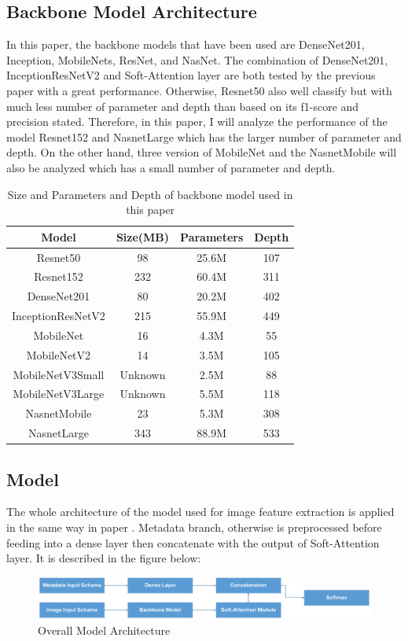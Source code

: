 \subsection{Backbone Model Architecture}
In this paper, the backbone models that have been used are DenseNet201\cite{06993}, Inception\cite{00567}, MobileNets\cite{04861}\cite{04381}\cite{02244}, ResNet\cite{03385}\cite{05027}, and NasNet\cite{07012}. The combination of DenseNet201, InceptionResNetV2 and Soft-Attention layer are both tested by the previous paper\cite{03358} with a great performance. Otherwise, Resnet50 also well classify but with much less number of parameter and depth than based on its f1-score and precision stated. Therefore, in this paper, I will analyze the performance of the model Resnet152 and NasnetLarge which has the larger number of parameter and depth. On the other hand, three version of MobileNet and the NasnetMobile will also be analyzed which has a small number of parameter and depth.  
\FloatBarrier
\begin{table}[ht]
	\centering
	\begin{tabular}{|c | c c c|} 
		\hline
		Model & Size(MB) & Parameters & Depth \\ 
		\hline
		Resnet50 & 98 & 25.6M & 107 \\ 
		\hline
		Resnet152 & 232 & 60.4M & 311 \\ 
		\hline
		DenseNet201 & 80 & 20.2M & 402 \\
		\hline
		InceptionResNetV2 & 215 & 55.9M & 449 \\
		\hline
		MobileNet & 16 & 4.3M & 55 \\ 
		\hline
		MobileNetV2 & 14 & 3.5M & 105 \\ 
		\hline
		MobileNetV3Small & Unknown & 2.5M & 88 \\ 
		\hline
		MobileNetV3Large & Unknown & 5.5M & 118 \\
		\hline
		NasnetMobile & 23 & 5.3M & 308 \\
		\hline
		NasnetLarge & 343 & 88.9M & 533 \\ 
		\hline
	\end{tabular}
\caption{Size and Parameters and Depth of backbone model used in this paper}
\label{table:2}
\end{table}
\FloatBarrier
\subsection{Model}
The whole architecture of the model used for image feature extraction is applied in the same way in paper \cite{03358}. Metadata branch, otherwise is preprocessed before feeding into a dense layer then concatenate with the output of Soft-Attention layer. It is described in the figure below:
\begin{figure}[h]
	\centering
	\includegraphics[width=1\linewidth]{Diagram/MainModel}
	\caption{Overall Model Architecture}
	\label{fig:mainmodel}
\end{figure}
